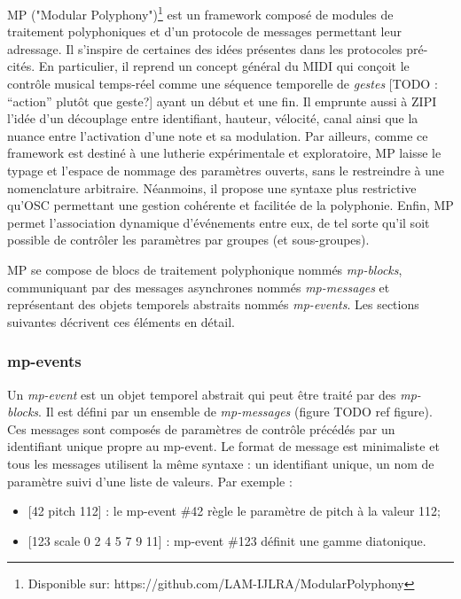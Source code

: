 MP ("Modular Polyphony")\footnote{ Disponible sur: https://github.com/LAM-IJLRA/ModularPolyphony} est un framework composé de modules de traitement polyphoniques et d'un protocole de messages permettant leur adressage. Il s'inspire de certaines des idées présentes dans les protocoles pré-cités. En particulier, il reprend un concept général du MIDI qui conçoit le contrôle musical temps-réel comme une séquence temporelle de \textit{gestes} [TODO : ``action'' plutôt que geste?] ayant un début et une fin. Il emprunte aussi à ZIPI l'idée d'un découplage entre identifiant, hauteur, vélocité, canal ainsi que la nuance entre l'activation d'une note et sa modulation. Par ailleurs, comme ce framework est destiné à une lutherie expérimentale et exploratoire, MP laisse le typage et l'espace de nommage des paramètres ouverts, sans le restreindre à une nomenclature arbitraire. Néanmoins, il propose une syntaxe plus restrictive qu'OSC permettant une gestion cohérente et facilitée de la polyphonie. Enfin, MP permet l'association dynamique d'événements entre eux, de tel sorte qu'il soit possible de contrôler les paramètres par groupes (et sous-groupes).

MP se compose de blocs de traitement polyphonique nommés \textit{mp-blocks}, communiquant par des messages asynchrones nommés \textit{mp-messages} et représentant des objets temporels abstraits nommés \textit{mp-events}. Les sections suivantes décrivent ces éléments en détail.

\subsubsection{mp-events}
Un \textit{mp-event} est un objet temporel abstrait qui peut être traité par des \textit{mp-blocks}. Il est défini par un ensemble de \textit{mp-messages} (figure TODO ref figure). Ces messages sont composés de paramètres de contrôle précédés par un identifiant unique propre au mp-event. Le format de message est minimaliste et tous les messages utilisent la même syntaxe : un identifiant unique, un nom de paramètre suivi d'une liste de valeurs. Par exemple :
\vspace{-1em}
\begin{itemize}[noitemsep]
	\item{[42 pitch 112] : le mp-event \#42 règle le paramètre de pitch à la valeur 112;}
	\item{[123 scale 0 2 4 5 7 9 11] : mp-event \#123 définit une gamme diatonique.}
\end{itemize}

